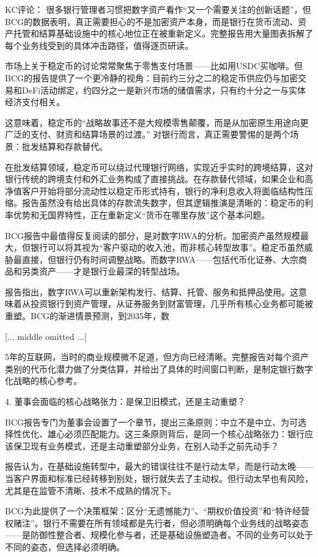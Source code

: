 \documentclass[11pt]{ctexart}
\begin{document}
KC评论： 很多银行管理者习惯把数字资产看作“又一个需要关注的创新话题”，但BCG的数据表明，真正需要担心的不是加密资产本身，而是银行在货币流动、资产托管和结算基础设施中的核心地位正在被重新定义。完整报告用大量图表拆解了每个业务线受到的具体冲击路径，值得逐页研读。

市场上关于稳定币的讨论常常聚焦于零售支付场景——比如用USDC买咖啡。但BCG的报告提供了一个更冷静的视角：目前约三分之二的稳定币供应仍与加密交易和DeFi活动绑定，约四分之一是新兴市场的储值需求，只有约十分之一与实体经济支付相关。

这意味着，稳定币的“战略故事还不是大规模零售颠覆，而是从加密原生用途向更广泛的支付、财资和结算场景的过渡。” 对银行而言，真正需要警惕的是两个场景：批发结算和存款替代。

在批发结算领域，稳定币可以绕过代理银行网络，实现近乎实时的跨境结算，这对银行传统的跨境支付和外汇业务构成了直接挑战。在存款替代领域，如果企业和高净值客户开始将部分流动性以稳定币形式持有，银行的净利息收入将面临结构性压缩。报告虽然没有给出具体的存款流失数字，但其逻辑推演是清晰的：稳定币的利率优势和无国界特性，正在重新定义“货币在哪里存放”这个基本问题。

BCG报告中最值得反复阅读的部分，是对数字RWA的分析。加密资产虽然规模最大，但银行可以将其视为“客户驱动的收入池，而非核心转型故事”。稳定币虽然威胁最直接，但银行仍有时间调整战略。而数字RWA——包括代币化证券、大宗商品和另类资产——才是银行业最深的转型战场。

报告指出，数字RWA可以重新架构发行、结算、托管、服务和抵押品使用。这意味着从投资银行到资产管理，从证券服务到财富管理，几乎所有核心业务都可能被重塑。BCG的渐进情景预测，到2035年，数

[... middle omitted ...]

5年的互联网，当时的商业规模微不足道，但方向已经清晰。完整报告对每个资产类别的代币化潜力做了分类估算，并给出了具体的时间窗口判断，是制定银行数字化战略的核心参考。

4. 董事会面临的核心战略张力：是保卫旧模式，还是主动重塑？

BCG报告专门为董事会设置了一个章节，提出三条原则：中立不是中立、为可选择性优化、雄心必须匹配能力。这三条原则背后，是同一个核心战略张力：银行应该保卫现有业务模式，还是主动重塑部分业务，在别人动手之前先动手？

报告认为，在基础设施转型中，最大的错误往往不是行动太早，而是行动太晚——当客户界面和标准已经转移到别处，银行就失去了主动权。但行动太早也有风险，尤其是在监管不清晰、技术不成熟的情况下。

BCG为此提供了一个决策框架：区分“无遗憾能力”、“期权价值投资”和“特许经营权赌注”。银行不需要在所有领域都是先行者，但必须明确每个业务线的战略姿态——是防御性整合者、规模化参与者，还是基础设施塑造者。不同的业务可以处于不同的姿态，但选择必须明确。
\end{document}
